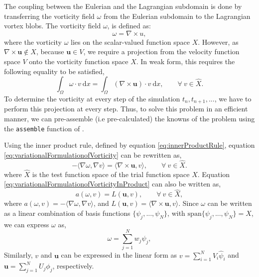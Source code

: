 The coupling between the Eulerian and the Lagrangian subdomain is done by transferring the vorticity field $\omega$ from the Eulerian subdomain to the Lagrangian vortex blobs. The vorticity field $\omega$, is defined as:
	\begin{equation}
	\omega = \nabla \times u,
	\label{eq:vorticityEq}
	\end{equation}
where the vorticity $\omega$ lies on the scalar-valued function space $X$. However, as $\nabla\times\mathbf{u}\notin{X}$, because $\mathbf{u}\in V$, we require a projection from the velocity function space $V$ onto the vorticity function space $X$. In weak form, this requires the following equality to be satisfied,
	\begin{equation}
	\int_{\Omega} \omega \cdot v\ \mathrm{d}x = \int_{\Omega} (\nabla \times \mathbf{u}) \cdot v\ \mathrm{d}x, \qquad \forall\ v \in \hat{X}.
	\label{eq:variationalFormulationofVorticity}
	\end{equation}
To determine the vorticity at every step of the simulation $t_n, t_{n+1}, ...$, we have to perform this projection at every step. Thus, to solve this problem in an efficient manner, we can pre-assemble (i.e pre-calculated) the knowns of the problem using the \texttt{assemble} function of \dolfin. 

Using the inner product rule, defined by equation \ref{eq:innerProductRule}, equation \ref{eq:variationalFormulationofVorticity} can be rewritten as,
	\begin{equation}
	-\langle \nabla \omega,\nabla v \rangle = \langle \nabla \times \mathbf{u},v \rangle, \qquad \forall\ v \in \hat{X}.
	\label{eq:variationalFormulationofVorticityInProduct}
	\end{equation}
where $\hat{X}$ is the test function space of the trial function space $X$. Equation 	\ref{eq:variationalFormulationofVorticityInProduct} can also be written as, 
		\begin{equation}
		a(\omega,v) = L(\mathbf{u},v), \qquad \forall\ v \in \hat{X},
		\label{eq:variationalFormulationofVorticityInProductSimple}
		\end{equation}
where $a(\omega,v) = -\langle \nabla \omega,\nabla v \rangle$, and $L(\mathbf{u},v) =  \langle \nabla \times \mathbf{u},v \rangle$. Since $\omega$ can be written as a linear combination of basis functions $\{\psi_j,...,\psi_N\}$, with $\mathrm{span}\{\psi_j,...,\psi_N\} = X$, we can express $\omega$ as,
		\begin{equation}
		\omega = \sum_{j=1}^N w_j\psi_j,
		\label{eq:vorticityLinear}
		\end{equation}
Similarly, $v$ and $\mathbf{u}$ can be expressed in the linear form as $v = \sum_{i=1}^N V_i \hat{\psi}_i$ and $\mathbf{u} = \sum_{j=1}^N U_j \phi_j$, respectively. 

